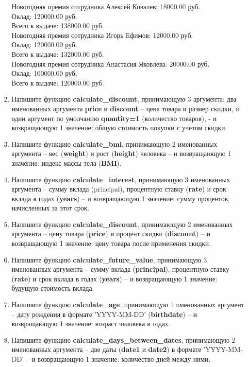 \documentclass[a4,12pt]{article}
\theoremstyle{remark}
\begin{document}
\begin{enumerate}
\begin{outputformat}[title=Вывод]
    Новогодняя премия сотрудника Алексей Ковалев: 18000.00 руб. \\
    Оклад: 120000.00 руб. \\
    Всего к выдаче: 138000.00 руб. \\

    Новогодняя премия сотрудника Игорь Ефимов: 12000.00 руб. \\
    Оклад: 120000.00 руб. \\
    Всего к выдаче: 132000.00 руб. \\

    Новогодняя премия сотрудника Анастасия Яковлева: 20000.00 руб. \\
    Оклад: 100000.00 руб. \\
    Всего к выдаче: 120000.00 руб. \\
    \end{outputformat}


    \item Напишите функцию \textbf{calculate\_discount}, принимающую 3 аргумента: два именованных аргумента \textbf{price} и \textbf{discount} – цена товара и размер скидки, и один аргумент по умолчанию \textbf{quantity=1} (количество товаров), - и возвращающую 1 значение: общую стоимость покупки с учетом скидки.
    \item Напишите функцию \textbf{calculate\_bmi}, принимающую 2 именованных аргумента – вес (\textbf{weight}) и рост (\textbf{height}) человека – и возвращающую 1 значение: индекс массы тела (\textbf{BMI}).
    \item Напишите функцию \textbf{calculate\_interest}, принимающую 3 именованных аргумента – сумму вклада (principal), процентную ставку (\textbf{rate}) и срок вклада в годах (\textbf{years}) – и возвращающую 1 значение: сумму процентов, начисленных за этот срок.
    \item Напишите функцию \textbf{calculate\_discount}, принимающую 2 именованных аргумента – цену товара (\textbf{price}) и процент скидки (\textbf{discount}) – и возвращающую 1 значение: цену товара после применения скидки.
    \item Напишите функцию \textbf{calculate\_future\_value}, принимающую 3 именованных аргумента – сумму вклада (\textbf{principal}), процентную ставку (\textbf{rate}) и срок вклада в годах (\textbf{years}) – и возвращающую 1 значение: будущую стоимость вклада.
    \item Напишите функцию \textbf{calculate\_age}, принимающую 1 именованных аргумент – дату рождения в формате 'YYYY-MM-DD' (\textbf{birthdate}) – и возвращающую 1 значение: возраст человека в годах.
    \item Напишите функцию \textbf{calculate\_days\_between\_dates}, принимающую 2 именованных аргумента – две даты (\textbf{date1} и \textbf{date2}) в формате 'YYYY-MM-DD' – и возвращающую 1 значение: количество дней между ними.
\end{enumerate}
\end{document}
